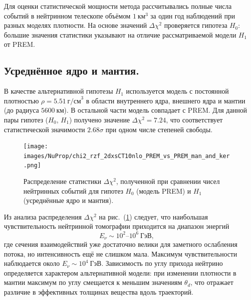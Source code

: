 Для оценки статистической мощности метода рассчитывались полные числа событий в нейтринном телескопе объёмом $1~\text{км}^3$ за один год наблюдений при разных моделях плотности. На основе значений $\Delta\chi^2$ проверяется гипотеза $H_0$: большие значения статистики указывают на отличие рассматриваемой модели $H_1$ от PREM.

\subsection*{Усреднённое ядро и мантия.}  
В качестве альтернативной гипотезы $H_1$ используется модель с постоянной плотностью $\rho = 5.51~\text{г/см}^3$ в области внутреннего ядра, внешнего ядра и мантии (до радиуса $5600~\text{км}$).  
В остальной части модель совпадает с PREM.  
Для данной пары гипотез ($H_0$, $H_1$) получено значение $\Delta\chi^2 = 7.24$, что соответствует статистической значимости $2.68\sigma$ при одном числе степеней свободы.
  
  \begin{figure}[!h]
    \centering
    \texttt{[image: images/NuProp/chi2\_rzf\_2dxsCT10nlo\_PREM\_vs\_PREM\_man\_and\_ker.png]}
    \caption{Распределение статистики $\Delta\chi^2$, полученной при сравнении чисел нейтринных событий для гипотез $H_0$ (модель PREM) и $H_1$ (усреднённые ядро и мантия).}
    \label{NuTom1}
  \end{figure}

Из анализа распределения $\Delta\chi^2$ на рис.~(\ref{NuTom1}) следует, что наибольшая чувствительность нейтринной томографии приходится на диапазон энергий  
\[
E_\nu \sim 10^2\text{–}10^6~\text{ГэВ},
\]
где сечения взаимодействий уже достаточно велики для заметного ослабления потока, но интенсивность ещё не слишком мала.  
Максимум чувствительности наблюдается около $E_\nu \sim 10^4~\text{ГэВ}$.  
Зависимость по углу прихода нейтрино определяется характером альтернативной модели: при изменении плотности в мантии максимум по углу смещается к меньшим значениям $\theta_d$, что отражает различие в эффективных толщинах вещества вдоль траекторий.
